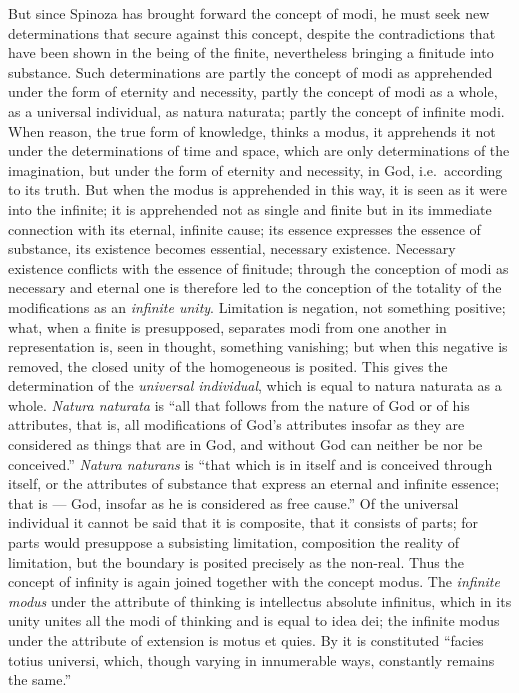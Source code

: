 But since Spinoza has brought forward the concept of modi, he must seek
new determinations that secure against this concept, despite the
contradictions that have been shown in the being of the finite,
nevertheless bringing a finitude into substance.
Such determinations are partly the concept of modi as apprehended under
the form of eternity and necessity, partly the concept of modi as a
whole, as a universal individual, as natura naturata; partly the concept
of infinite modi. When reason, the true form of knowledge, thinks a
modus, it apprehends it not under the determinations of time and space,
which are only determinations of the imagination, but under the form of
eternity and necessity, in God, i.e.\ according to its truth. But when
the modus is apprehended in this way, it is seen as it were into the
infinite; it is apprehended not as single and finite but in its
immediate connection with its eternal, infinite cause; its essence
expresses the essence of substance, its existence becomes essential,
necessary existence. Necessary existence conflicts with the essence of
finitude; through the conception of modi as necessary and eternal one is
therefore led to the conception of the totality of the modifications as
an \emph{infinite unity}. Limitation is negation, not something
positive; what, when a finite is presupposed, separates modi from one
another in representation is, seen in thought, something vanishing; but
when this negative is removed, the closed unity of the homogeneous is
posited. This gives the determination of the \emph{universal
individual}, which is equal to natura naturata as a whole.
\emph{Natura naturata} is ``all that follows from the nature of God or
of his attributes, that is, all modifications of God's attributes
insofar as they are considered as things that are in God, and without
God can neither be nor be conceived.'' \emph{Natura naturans}
is ``that which is in itself and is conceived through itself, or the
attributes of substance that express an eternal and infinite essence;
that is --- God, insofar as he is considered as free cause.'' Of the
universal individual it cannot be said that it is composite, that it
consists of parts; for parts would presuppose a subsisting limitation,
composition the reality of limitation, but the boundary is posited
precisely as the non-real. Thus the concept of infinity is again joined
together with the concept modus. The \emph{infinite modus} under the
attribute of thinking is intellectus absolute infinitus, which in its
unity unites all the modi of thinking and is equal to idea dei; the
infinite modus under the attribute of extension is motus et quies. By it
is constituted ``facies totius universi, which, though varying in
innumerable ways, constantly remains the same.''

